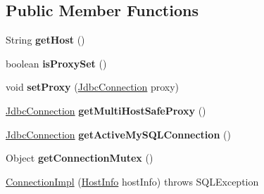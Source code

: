 \subsection*{Public Member Functions}
\begin{DoxyCompactItemize}
\item 
\mbox{\label{classcom_1_1mysql_1_1cj_1_1jdbc_1_1_connection_impl_a2f4788ba10e12dfcced8972989aa44d4}} 
String {\bfseries get\+Host} ()
\item 
\mbox{\label{classcom_1_1mysql_1_1cj_1_1jdbc_1_1_connection_impl_aedabb7228489905f7f53a433e5597133}} 
boolean {\bfseries is\+Proxy\+Set} ()
\item 
\mbox{\label{classcom_1_1mysql_1_1cj_1_1jdbc_1_1_connection_impl_a2fd722cbf9248f2d11b194cd5a91441f}} 
void {\bfseries set\+Proxy} (\mbox{\hyperlink{interfacecom_1_1mysql_1_1cj_1_1jdbc_1_1_jdbc_connection}{Jdbc\+Connection}} proxy)
\item 
\mbox{\label{classcom_1_1mysql_1_1cj_1_1jdbc_1_1_connection_impl_af8f366cfa07f84c942f9f73f22dba006}} 
\mbox{\hyperlink{interfacecom_1_1mysql_1_1cj_1_1jdbc_1_1_jdbc_connection}{Jdbc\+Connection}} {\bfseries get\+Multi\+Host\+Safe\+Proxy} ()
\item 
\mbox{\label{classcom_1_1mysql_1_1cj_1_1jdbc_1_1_connection_impl_acc626e9289e8a7591bf56f0df92f4ef1}} 
\mbox{\hyperlink{interfacecom_1_1mysql_1_1cj_1_1jdbc_1_1_jdbc_connection}{Jdbc\+Connection}} {\bfseries get\+Active\+My\+S\+Q\+L\+Connection} ()
\item 
\mbox{\label{classcom_1_1mysql_1_1cj_1_1jdbc_1_1_connection_impl_a2d5f7dcbb793d20fce3c805a2ad96b80}} 
Object {\bfseries get\+Connection\+Mutex} ()
\item 
\mbox{\hyperlink{classcom_1_1mysql_1_1cj_1_1jdbc_1_1_connection_impl_a821f9640583d1b2daea0424f3b0ea945}{Connection\+Impl}} (\mbox{\hyperlink{classcom_1_1mysql_1_1cj_1_1conf_1_1_host_info}{Host\+Info}} host\+Info)  throws S\+Q\+L\+Exception 
\item 

\end{DoxyCompactItemize}
